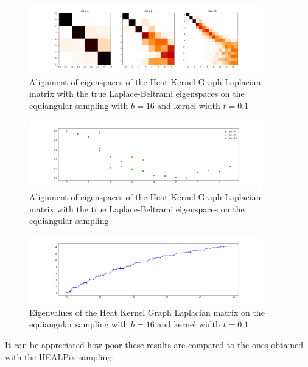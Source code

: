 \begin{figure}[h!]
	\centering
	\label{fig:equiangular sampling alignment}
	\caption{Alignment of eigenspaces of the Heat Kernel Graph Laplacian matrix with the true Laplace-Beltrami eigenspaces on the equiangular sampling with $b=16$ and kernel width $t=0.1$}
	\includegraphics[width=0.9\textwidth]{../codes/02.HeatKernelGraphLaplacian/equiangular/equi_full.png}
\end{figure}
\begin{figure}[h!]
	\centering
	\label{fig:equiangular sampling alignment diagonal}
	\caption{Alignment of eigenspaces of the Heat Kernel Graph Laplacian matrix with the true Laplace-Beltrami eigenspaces on the equiangular sampling}
	\includegraphics[width=0.9\textwidth]{../codes/02.HeatKernelGraphLaplacian/equiangular/equi_full_diagonal.png}
\end{figure}
\begin{figure}[h!]
	\centering
	\label{fig:equiangular sampling alignment eigenvalues}
	\caption{Eigenvalues of the Heat Kernel Graph Laplacian matrix on the equiangular sampling with $b=16$ and kernel width $t=0.1$}
	\includegraphics[width=0.9\textwidth]{../codes/02.HeatKernelGraphLaplacian/equiangular/equi_full_eigenvalues_16.png}
\end{figure}

It can be appreciated how poor these results are compared to the ones obtained with the HEALPix sampling. \\

